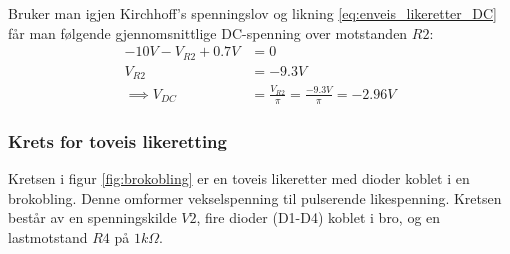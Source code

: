             Bruker man igjen Kirchhoff's spenningslov og likning \eqref{eq:enveis_likeretter_DC} får man følgende gjennomsnittlige DC-spenning over motstanden $R2$:
            \begin{align*}
                -10V - V_{R2} + 0.7V &= 0 \\
                V_{R2} &= -9.3V \\
                \implies V_{DC} &= \frac{V_{R2}}{\pi} =\frac{-9.3V}{\pi} = -2.96V
            \end{align*}

        \subsubsection{Krets for toveis likeretting}
            Kretsen i figur \ref{fig:brokobling} er en toveis likeretter med dioder koblet i en brokobling. Denne omformer vekselspenning til pulserende likespenning. Kretsen består av en spenningskilde $V2$, fire dioder (D1-D4) koblet i bro, og en lastmotstand $R4$ på $1k\Omega$.

